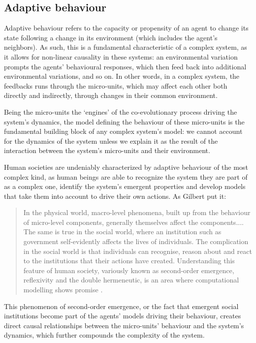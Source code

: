\documentclass[review]{elsarticle}
\begin{document}
\subsection{Adaptive behaviour}
Adaptive behaviour refers to the capacity or propensity of an agent to change its state following a change in its environment (which includes the agent's neighbors). As such, this is a fundamental characteristic of a complex system, as it allows for non-linear causality in these systems: an environmental variation prompts the agents' behavioural responses, which then feed back into additional environmental variations, and so on. In other words, in a complex system, the feedbacks runs through the micro-units, which may affect each other both directly and indirectly, through changes in their common environment. 

Being the micro-units the `engines' of the co-evolutionary process driving the system's dynamics, the model defining the behaviour of these micro-units is the fundamental building block of any complex system's model: we cannot account for the dynamics of the system unless we explain it as the result of the interaction between the system's micro-units and their environment.

Human societies are undeniably characterized by adaptive behaviour of the most complex kind, as human beings are able to recognize the system they are part of as a complex one, identify the system's emergent properties and develop models that take them into account to drive their own actions. As Gilbert put it:

\begin{quote}
In the physical world, macro-level phenomena, built up from the behaviour of micro-level components, generally themselves affect the components....
The same is true in the social world, where an institution such as government self-evidently affects the lives of individuals. The complication in the social world is that individuals can recognise, reason about and react to the institutions that their actions have created. Understanding this feature of human society, variously known as second-order emergence, reflexivity and the double hermeneutic, is an area where computational modelling shows promise \citep[][p. 5]{gilbert00}.
\end{quote}

This phenomenon of second-order emergence, or the fact that emergent social institutions become part of the agents' models driving their behaviour, creates direct causal relationships between the micro-units' behaviour and the system's dynamics, which further compounds the complexity of the system.
\end{document}

